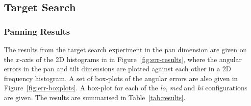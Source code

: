 \documentclass[format=sigconf, review=true, screen=true, anonymous=true]{acmart}
\begin{document}

\subsection{Target Search}

\subsubsection{Panning Results}

The results from the target search experiment in the pan dimension are given on the $x$-axis of the 2D histograms in in Figure~\ref{fig:err-results}, where the angular errors in the pan and tilt dimensions are plotted against each other in a 2D frequency histogram. A set of box-plots of the angular errors are also given in Figure~\ref{fig:err-boxplots}. A box-plot for each of the \emph{lo}, \emph{med} and \emph{hi} configurations are given. The results are summarised in Table~\ref{tab:results}.
\end{document}
